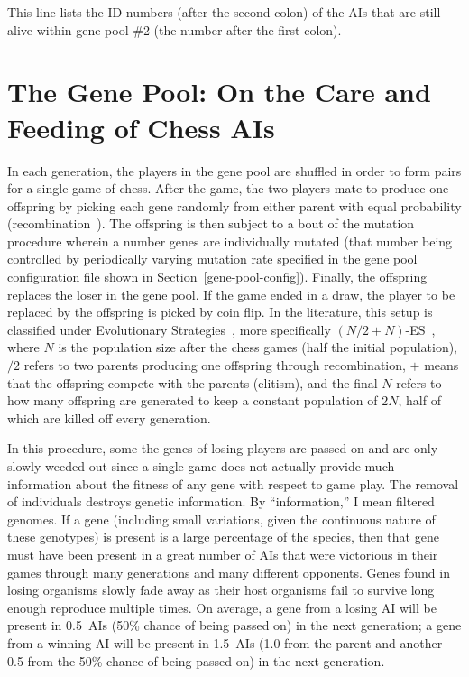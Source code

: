 \documentclass[letterpaper]{article}
\renewcommand{\_}{\allowbreak\textunderscore\allowbreak}
\begin{document}
This line lists the ID numbers (after the second colon) of the AIs that are still alive within gene pool \#2 (the number after the first colon).

\section{The Gene Pool: On the Care and Feeding of Chess AIs}\label{gene-pool-section}
In each generation, the players in the gene pool are shuffled in order to form pairs for a single game of chess. After the game, the two players mate to produce one offspring by picking each gene randomly from either parent with equal probability (recombination~\cite{recombination-wiki}). The offspring is then subject to a bout of the mutation procedure wherein a number genes are individually mutated (that number being controlled by periodically varying mutation rate specified in the gene pool configuration file shown in Section~\ref{gene-pool-config}). Finally, the offspring replaces the loser in the gene pool. If the game ended in a draw, the player to be replaced by the offspring is picked by coin flip. In the literature, this setup is classified under Evolutionary Strategies~\cite{evolution-strategy-wiki}, more specifically \((N/2+N)\)-ES~\cite{evolution-strategy-glossary}, where \(N\) is the population size after the chess games (half the initial population), \(/2\) refers to two parents producing one offspring through recombination, \(+\) means that the offspring compete with the parents (elitism), and the final \(N\) refers to how many offspring are generated to keep a constant population of \(2N\), half of which are killed off every generation.

In this procedure, some the genes of losing players are passed on and are only slowly weeded out since a single game does not actually provide much information about the fitness of any gene with respect to game play. The removal of individuals destroys genetic information. By ``information,'' I mean filtered genomes. If a gene (including small variations, given the continuous nature of these genotypes) is present is a large percentage of the species, then that gene must have been present in a great number of AIs that were victorious in their games through many generations and many different opponents. Genes found in losing organisms slowly fade away as their host organisms fail to survive long enough reproduce multiple times. On average, a gene from a losing AI will be present in 0.5~AIs (50\% chance of being passed on) in the next generation; a gene from a winning AI will be present in 1.5~AIs (1.0 from the parent and another 0.5 from the 50\% chance of being passed on) in the next generation.
\end{document}
